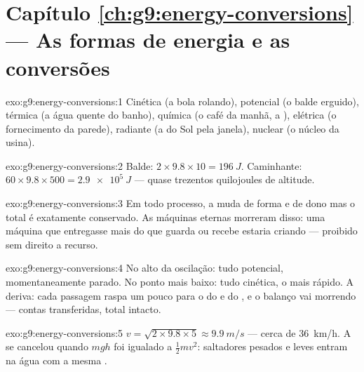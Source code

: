 \section*{Capítulo \ref{ch:g9:energy-conversions} --- As formas de energia e as conversões}

\begin{solution}{exo:g9:energy-conversions:1}
Cinética (a bola rolando), potencial (o balde erguido), térmica (a
água quente do banho), química (o café da manhã, a ), elétrica
(o fornecimento da parede), radiante (a  do Sol pela janela),
nuclear (o núcleo da usina).
\end{solution}

\begin{solution}{exo:g9:energy-conversions:2}
Balde: $2 \times 9.8 \times 10 = \qty{196}{J}$. Caminhante:
$60 \times 9.8 \times 500 = \qty{2.9e5}{J}$ --- quase trezentos
quilojoules de altitude.
\end{solution}

\begin{solution}{exo:g9:energy-conversions:3}
Em todo processo, a  muda de forma e de dono mas o total é
exatamente conservado. As máquinas eternas morreram disso: uma
máquina que entregasse mais do que guarda ou recebe estaria criando
 --- proibido sem direito a recurso.
\end{solution}

\begin{solution}{exo:g9:energy-conversions:4}
No alto da oscilação: tudo potencial, momentaneamente parado. No
ponto mais baixo: tudo cinética, o mais rápido. A deriva: cada
passagem raspa um pouco para o  do  e do , e o balanço vai
morrendo --- contas transferidas, total intacto.
\end{solution}

\begin{solution}{exo:g9:energy-conversions:5}
$v = \sqrt{2 \times 9.8 \times 5} \approx \qty{9.9}{m/s}$ --- cerca
de \qty{36}{km/h}. A  se cancelou quando $m g h$ foi igualado a
$\frac12 m v^2$: saltadores pesados e leves entram na água com a
mesma .
\end{solution}


